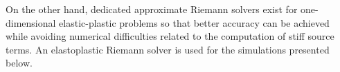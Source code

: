 

On the other hand, dedicated approximate Riemann solvers exist for one-dimensional elastic-plastic problems so that better accuracy can be achieved while avoiding numerical difficulties related to the computation of stiff source terms. An elastoplastic Riemann solver is used for the simulations presented below.

